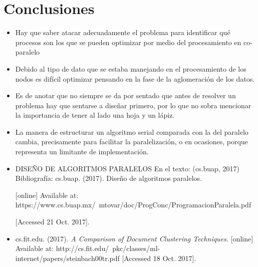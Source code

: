 \documentclass[fleqn,10pt]{SelfArx} %
\begin{document}
\section*{Conclusiones} %


\begin{itemize}
	\item Hay que saber atacar adecuadamente el problema para identificar qué procesos son los que se pueden optimizar por medio del procesamiento en co-paralelo
	\item Debido al tipo de dato que se estaba manejando en el procesamiento de los nodos es difícil optimizar pensando en la fase de la aglomeración de los datos.
	\item Es de anotar que no siempre se da por sentado que antes de resolver un problema hay que sentarse a diseñar primero, por lo que no sobra mencionar la importancia de tener al lado una hoja y un lápiz.
	\item La manera de estructurar un algoritmo serial comparada con la del paralelo cambia, precisamente para facilitar la paralelización, o en ocasiones, porque representa un limitante de implementación.
\end{itemize}


%

\begin{itemize}[noitemsep] %
	\item DISEÑO DE ALGORITMOS PARALELOS
	En el texto: (cs.buap, 2017)
	Bibliografía: cs.buap. (2017). Diseño de algoritmos paralelos. 
	
	[online] Available at: https://www.cs.buap.mx/~mtovar/doc/ProgConc/ProgramacionParalela.pdf 
	
	[Accessed 21 Oct. 2017].
	\item cs.fit.edu. (2017). \textit{A Comparison of Document Clustering Techniques.} [online] Available at: http://cs.fit.edu/~pkc/classes/ml-internet/papers/steinbach00tr.pdf [Accessed 18 Oct. 2017].
	\label{refer:1}
\end{itemize}
\end{document}
